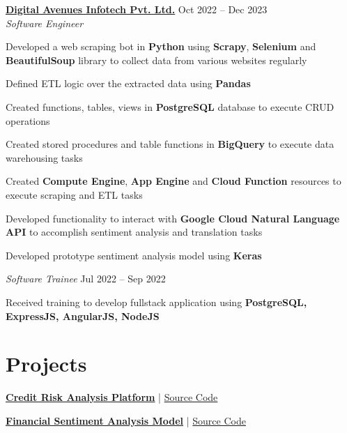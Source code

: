 \documentclass[a4paper,10pt]{article}
\begin{document}
\vspace{4pt}

\textbf{\href{https://www.digitalavenues.com}{Digital Avenues Infotech Pvt. Ltd.}} \hfill Oct 2022 -- Dec 2023\\
\textit{Software Engineer}
\begin{experiencelist}
\item Developed a web scraping bot in \textbf{Python} using \textbf{Scrapy}, \textbf{Selenium} and \textbf{BeautifulSoup} library to collect data from various websites regularly
\item Defined ETL logic over the extracted data using \textbf{Pandas}
\item Created functions, tables, views in \textbf{PostgreSQL} database to execute CRUD operations
\item Created stored procedures and table functions in \textbf{BigQuery} to execute data warehousing tasks
\item Created \textbf{Compute Engine}, \textbf{App Engine} and \textbf{Cloud Function} resources to execute scraping and ETL tasks
\item Developed functionality to interact with \textbf{Google Cloud Natural Language API} to accomplish sentiment analysis and translation tasks
\item Developed prototype sentiment analysis model using \textbf{Keras}
\end{experiencelist}

\vspace{2pt}
\textit{Software Trainee} \hfill Jul 2022 -- Sep 2022
\begin{experiencelist}
\item Received training to develop fullstack application using \textbf{PostgreSQL, ExpressJS, AngularJS, NodeJS}
\end{experiencelist}

\section*{Projects}
\begin{experiencelist}
\item \textbf{\href{https://credit-risk-predictor-rhwr.onrender.com/}{Credit Risk Analysis Platform}} | \href{https://github.com/soumyadipnayak/summerschool2026/blob/main/models/credit_risk_analysis.ipynb}{Source Code}
\item \textbf{\href{https://1drv.ms/p/c/53c938a49db73b7f/IQApVodIiWXlTIKawG_rkJ_IAXPO01S7s7XnExXHszq200s}{Financial Sentiment Analysis Model}} | \href{https://github.com/soumyadipnayak/summerschool2026/blob/main/deep_learning/sentiment_analysis.ipynb}{Source Code}
\end{experiencelist}
\end{document}

